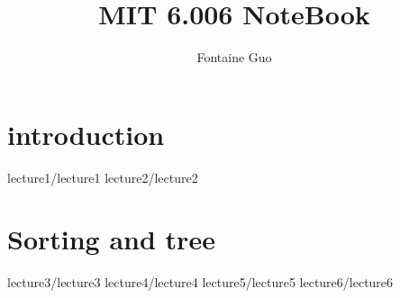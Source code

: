 \documentclass[a4paper, oneside]{book}
\title{MIT 6.006 NoteBook}
\author{Fontaine Guo}
\begin{document}
    \maketitle
    \chapter{introduction}
        {lecture1/lecture1}
        {lecture2/lecture2}

    \chapter{Sorting and tree}
        {lecture3/lecture3}
        {lecture4/lecture4}
        {lecture5/lecture5}
        {lecture6/lecture6}
\end{document}
